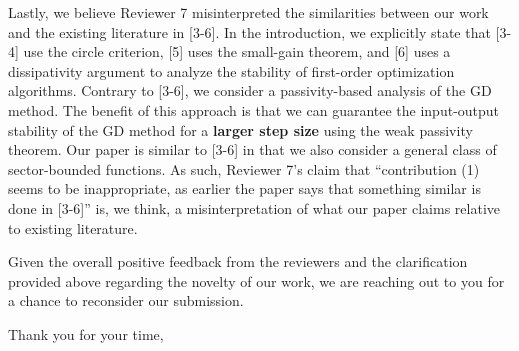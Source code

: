 \begin{flushleft}
    Lastly, we believe Reviewer 7 misinterpreted the similarities between our work and the existing literature in [3-6]. In the introduction, we explicitly state that [3-4] use the circle criterion, [5] uses the small-gain theorem, and [6] uses a dissipativity argument to analyze the stability of first-order optimization algorithms. Contrary to [3-6], we consider a passivity-based analysis of the GD method. The benefit of this approach is that we can guarantee the input-output stability of the GD method for a \textbf{larger step size} using the weak passivity theorem. Our paper is similar to [3-6] in that we also consider a general class of sector-bounded functions. As such, Reviewer 7's claim that ``contribution (1) seems to be inappropriate, as earlier the paper says that something similar is done in [3-6]'' is, we think, a misinterpretation of what our paper claims relative to existing literature.

    Given the overall positive feedback from the reviewers and the clarification provided above regarding the novelty of our work, we are reaching out to you for a chance to reconsider our submission.

    Thank you for your time,\\[1em]%
    \theauthor
\end{flushleft}
\newpage